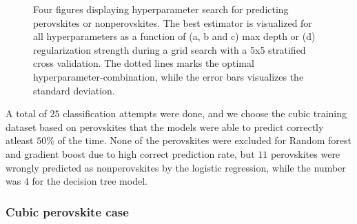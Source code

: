 \begin{figure}[!tbp]
  \begin{subfigure}[b]{1.0\textwidth}
    \centering
    
  \end{subfigure}
  \par\bigskip
  \begin{subfigure}[b]{0.5\textwidth}
    
    \caption{}
    \label{fig:per-LOG}
  \end{subfigure}%
  \hfill
  \begin{subfigure}[b]{0.5\textwidth}
    
    \caption{}
    \label{fig:per-DT}
  \end{subfigure}

  \begin{subfigure}[b]{0.5\textwidth}
    
    \caption{}
    \label{fig:per-RF}
  \end{subfigure}%
  \hfill
  \begin{subfigure}[b]{0.5\textwidth}
    
    \caption{}
    \label{fig:per-GB}
  \end{subfigure}
  \vspace*{-130mm}
  \caption{{Four figures displaying hyperparameter search for predicting perovskites or nonperovskites. The best estimator is visualized for all hyperparameters as a function of (a, b and c) max depth or (d) regularization strength during a grid search with a 5x5 stratified cross validation. The dotted lines marks the optimal hyperparameter-combination, while the error bars visualizes the standard deviation. }}
  \label{fig:perovskite-params}
\end{figure}

A total of $25$ classification attempts were done, and we choose the cubic training dataset based on perovskites that the models were able to predict correctly atleast $50\%$ of the time. None of the perovskites were excluded for Random forest and gradient boost due to high correct prediction rate, but $11$ perovskites were wrongly predicted as nonperovskites by the logistic regression, while the number was $4$ for the decision tree model.

\subsubsection{Cubic perovskite case}



